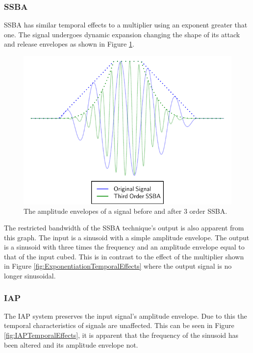		\subsubsection*{SSBA}
			SSBA has similar temporal effects to a multiplier using an exponent greater that one. The signal
			undergoes dynamic expansion changing the shape of its attack and release envelopes as shown in
			Figure \ref{fig:SSBATemporalEffects}.

			\begin{figure}[h!]
				\centering
				\includegraphics{chapter5/Images/SSBATemporalEffects.pdf}
				\caption{The amplitude envelopes of a signal before and after 3 order SSBA.}
				\label{fig:SSBATemporalEffects}
			\end{figure}

			The restricted bandwidth of the SSBA technique's output is also apparent from this graph. The input
			is a sinusoid with a simple amplitude envelope. The output is a sinusoid with three times the
			frequency and an amplitude envelope equal to that of the input cubed. This is in contrast to the
			effect of the multiplier shown in Figure \ref{fig:ExponentiationTemporalEffects} where the output
			signal is no longer sinusoidal.

		\subsubsection*{IAP}
			The IAP system preserves the input signal's amplitude envelope. Due to this the temporal
			characteristics of signals are unaffected. This can be seen in Figure \ref{fig:IAPTemporalEffects},
			it is apparent that the frequency of the sinusoid has been altered and its amplitude envelope not.

